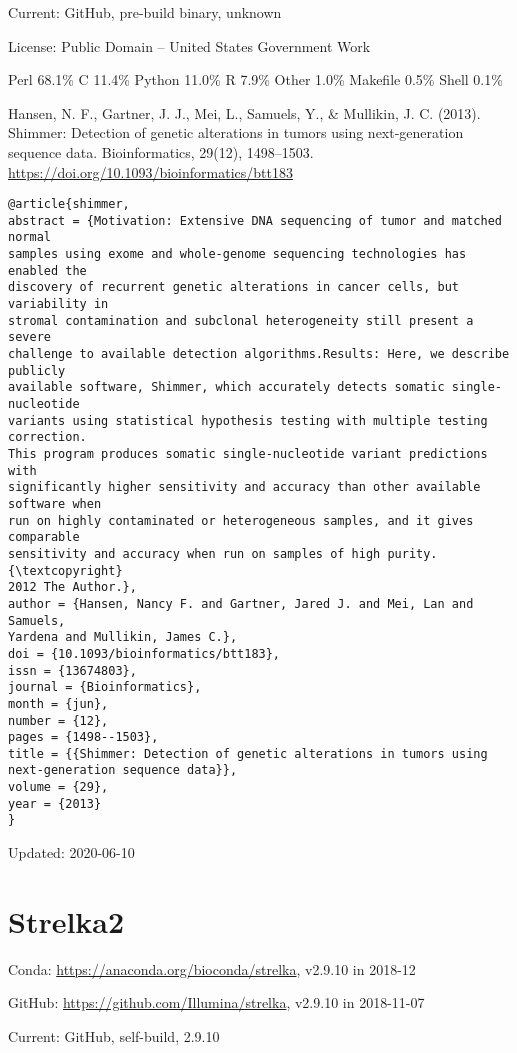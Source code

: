 \documentclass[]{article}
\begin{document}
Current: GitHub, pre-build binary, unknown

License: Public Domain -- United States Government Work

Perl 68.1\% C 11.4\% Python 11.0\% R 7.9\% Other 1.0\% Makefile 0.5\% Shell 0.1\%

Hansen, N. F., Gartner, J. J., Mei, L., Samuels, Y., \& Mullikin, J. C. (2013). Shimmer: Detection of genetic alterations in tumors using next-generation sequence data. Bioinformatics, 29(12), 1498–1503. \url{https://doi.org/10.1093/bioinformatics/btt183}

\begin{verbatim}
@article{shimmer,
abstract = {Motivation: Extensive DNA sequencing of tumor and matched normal
samples using exome and whole-genome sequencing technologies has enabled the
discovery of recurrent genetic alterations in cancer cells, but variability in
stromal contamination and subclonal heterogeneity still present a severe
challenge to available detection algorithms.Results: Here, we describe publicly
available software, Shimmer, which accurately detects somatic single-nucleotide
variants using statistical hypothesis testing with multiple testing correction.
This program produces somatic single-nucleotide variant predictions with
significantly higher sensitivity and accuracy than other available software when
run on highly contaminated or heterogeneous samples, and it gives comparable
sensitivity and accuracy when run on samples of high purity. {\textcopyright}
2012 The Author.},
author = {Hansen, Nancy F. and Gartner, Jared J. and Mei, Lan and Samuels,
Yardena and Mullikin, James C.},
doi = {10.1093/bioinformatics/btt183},
issn = {13674803},
journal = {Bioinformatics},
month = {jun},
number = {12},
pages = {1498--1503},
title = {{Shimmer: Detection of genetic alterations in tumors using
next-generation sequence data}},
volume = {29},
year = {2013}
}
\end{verbatim}

Updated: 2020-06-10

\section{Strelka2}

Conda: \url{https://anaconda.org/bioconda/strelka}, v2.9.10 in 2018-12

GitHub: \url{https://github.com/Illumina/strelka}, v2.9.10 in 2018-11-07

Current: GitHub, self-build, 2.9.10
\end{document}
